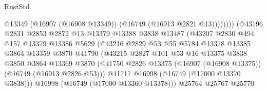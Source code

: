 \begin{lexlean}{RustStd}
\begin{coremodule}
                                              @13349
                                              (@16907 (@16908 @13349))
                                              (@16749 (@16913 @2821 @13))))))))
                                  (@43196
                                    @2831
                                    @2853
                                    @2872
                                    @13
                                    @13379
                                    @13388
                                    @3838
                                    @13487
                                    (@43207
                                      @2830
                                      @494
                                      @157
                                      @13379
                                      @13386
                                      @5629
                                      (@43216
                                        @2829
                                        @53
                                        @55
                                        @5784
                                        @13378
                                        @13385
                                        @3864
                                        @13359
                                        @3870
                                        @41790
                                        (@43215
                                          @2827
                                          @101
                                          @53
                                          @16
                                          @13375
                                          @3838
                                          @3850
                                          @3864
                                          @13369
                                          @3870
                                          (@41750
                                            @2826
                                            @13375
                                            (@16907 (@16908 @13375))
                                            (@16749 (@16913 @2826 @53)))
                                          @41717
                                          @16998
                                          (@16749 (@17000 @13370 @3838)))
                                        @16998
                                        (@16749 (@17000 @13360 @13378)))
                                      @25764
                                      @25767
                                      @25770

\end{coremodule}
\end{lexlean}
